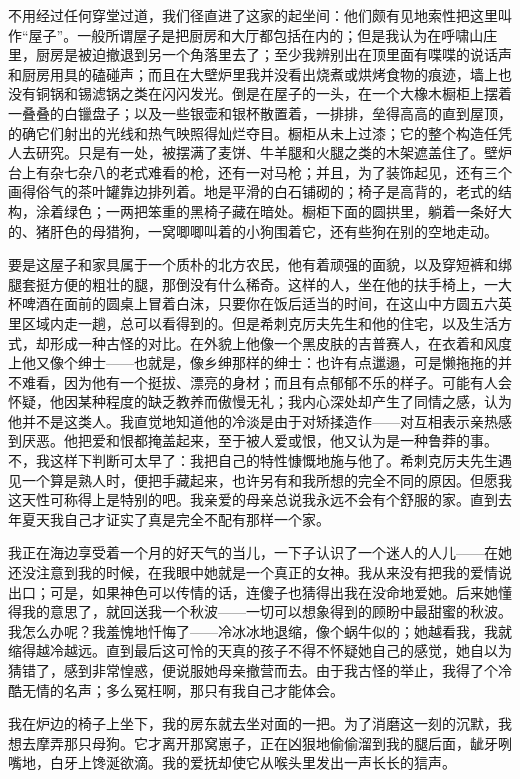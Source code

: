\par 不用经过任何穿堂过道，我们径直进了这家的起坐间：他们颇有见地索性把这里叫作“屋子”。一般所谓屋子是把厨房和大厅都包括在内的；但是我认为在呼啸山庄里，厨房是被迫撤退到另一个角落里去了；至少我辨别出在顶里面有喋喋的说话声和厨房用具的磕碰声；而且在大壁炉里我并没看出烧煮或烘烤食物的痕迹，墙上也没有铜锅和锡滤锅之类在闪闪发光。倒是在屋子的一头，在一个大橡木橱柜上摆着一叠叠的白镴盘子；以及一些银壶和银杯散置着，一排排，垒得高高的直到屋顶，的确它们射出的光线和热气映照得灿烂夺目。橱柜从未上过漆；它的整个构造任凭人去研究。只是有一处，被摆满了麦饼、牛羊腿和火腿之类的木架遮盖住了。壁炉台上有杂七杂八的老式难看的枪，还有一对马枪；并且，为了装饰起见，还有三个画得俗气的茶叶罐靠边排列着。地是平滑的白石铺砌的；椅子是高背的，老式的结构，涂着绿色；一两把笨重的黑椅子藏在暗处。橱柜下面的圆拱里，躺着一条好大的、猪肝色的母猎狗，一窝唧唧叫着的小狗围着它，还有些狗在别的空地走动。
\par 要是这屋子和家具属于一个质朴的北方农民，他有着顽强的面貌，以及穿短裤和绑腿套挺方便的粗壮的腿，那倒没有什么稀奇。这样的人，坐在他的扶手椅上，一大杯啤酒在面前的圆桌上冒着白沫，只要你在饭后适当的时间，在这山中方圆五六英里区域内走一趟，总可以看得到的。但是希刺克厉夫先生和他的住宅，以及生活方式，却形成一种古怪的对比。在外貌上他像一个黑皮肤的吉普赛人，在衣着和风度上他又像个绅士——也就是，像乡绅那样的绅士：也许有点邋遢，可是懒拖拖的并不难看，因为他有一个挺拔、漂亮的身材；而且有点郁郁不乐的样子。可能有人会怀疑，他因某种程度的缺乏教养而傲慢无礼；我内心深处却产生了同情之感，认为他并不是这类人。我直觉地知道他的冷淡是由于对矫揉造作——对互相表示亲热感到厌恶。他把爱和恨都掩盖起来，至于被人爱或恨，他又认为是一种鲁莽的事。不，我这样下判断可太早了：我把自己的特性慷慨地施与他了。希刺克厉夫先生遇见一个算是熟人时，便把手藏起来，也许另有和我所想的完全不同的原因。但愿我这天性可称得上是特别的吧。我亲爱的母亲总说我永远不会有个舒服的家。直到去年夏天我自己才证实了真是完全不配有那样一个家。
\par 我正在海边享受着一个月的好天气的当儿，一下子认识了一个迷人的人儿——在她还没注意到我的时候，在我眼中她就是一个真正的女神。我从来没有把我的爱情说出口；可是，如果神色可以传情的话，连傻子也猜得出我在没命地爱她。后来她懂得我的意思了，就回送我一个秋波——一切可以想象得到的顾盼中最甜蜜的秋波。我怎么办呢？我羞愧地忏悔了——冷冰冰地退缩，像个蜗牛似的；她越看我，我就缩得越冷越远。直到最后这可怜的天真的孩子不得不怀疑她自己的感觉，她自以为猜错了，感到非常惶惑，便说服她母亲撤营而去。由于我古怪的举止，我得了个冷酷无情的名声；多么冤枉啊，那只有我自己才能体会。
\par 我在炉边的椅子上坐下，我的房东就去坐对面的一把。为了消磨这一刻的沉默，我想去摩弄那只母狗。它才离开那窝崽子，正在凶狠地偷偷溜到我的腿后面，龇牙咧嘴地，白牙上馋涎欲滴。我的爱抚却使它从喉头里发出一声长长的狺声。
